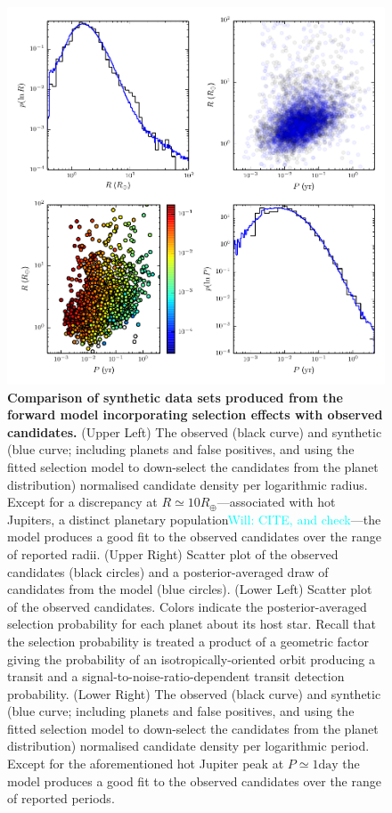 \documentclass{nature}
\newcommand{\REarth}{R_\oplus}
\newcommand{\Will}[1]{\textcolor{cyan}{Will: #1}}
\begin{document}
\begin{figure}
  \includegraphics[width=\columnwidth]{selection}
  \caption{\label{fig:selection} \textbf{Comparison of synthetic data
      sets produced from the forward model incorporating selection
      effects with observed candidates.}  (Upper Left) The observed
    (black curve) and synthetic (blue curve; including planets and
    false positives, and using the fitted selection model to
    down-select the candidates from the planet distribution)
    normalised candidate density per logarithmic radius.  Except for a
    discrepancy at $R \simeq 10 \REarth$---associated with hot
    Jupiters, a distinct planetary population\Will{CITE, and
      check}---the model produces a good fit to the observed
    candidates over the range of reported radii.  (Upper Right)
    Scatter plot of the observed candidates (black circles) and a
    posterior-averaged draw of candidates from the model (blue
    circles).  (Lower Left) Scatter plot of the observed candidates.
    Colors indicate the posterior-averaged selection probability for
    each planet about its host star.  Recall that the selection
    probability is treated a product of a geometric factor giving the
    probability of an isotropically-oriented orbit producing a transit
    and a signal-to-noise-ratio-dependent transit detection
    probability.  (Lower Right) The observed (black curve) and
    synthetic (blue curve; including planets and false positives, and
    using the fitted selection model to down-select the candidates
    from the planet distribution) normalised candidate density per
    logarithmic period.  Except for the aforementioned hot Jupiter
    peak at $P \simeq 1 \mathrm{day}$ the model produces a good fit to
    the observed candidates over the range of reported periods.}
\end{figure}
\end{document}
